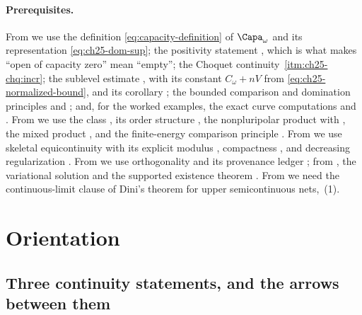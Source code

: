 \paragraph{Prerequisites.}
From  we use the definition
\eqref{eq:capacity-definition} of $\Capa_\omega$ and its representation
\eqref{eq:ch25-dom-sup}; the positivity statement
, which is what makes ``open of
capacity zero'' mean ``empty''; the Choquet continuity
\,\cref{itm:ch25-chq:incr}; the sublevel
estimate , with its constant
$C_\omega+nV$ from \eqref{eq:ch25-normalized-bound}, and its corollary
; the bounded comparison and domination
principles  and
; and, for the worked examples, the
exact curve computations
 and
.  From
 we use the class , its order structure
, the nonpluripolar product
 with , the mixed
product , and the finite-energy comparison
principle .  From
 we use skeletal equicontinuity
 with its explicit modulus
, compactness
, and decreasing regularization
.  From
 we use orthogonality
 and its provenance ledger
; from
, the variational solution
 and the supported existence
theorem .  From
 we need the continuous-limit clause of
Dini's theorem for upper semicontinuous nets,
\,(1).

\section{Orientation}
\label{sec:ch29-orientation}

\subsection{Three continuity statements, and the arrows between them}
\label{sec:ch29-three-continuities}

